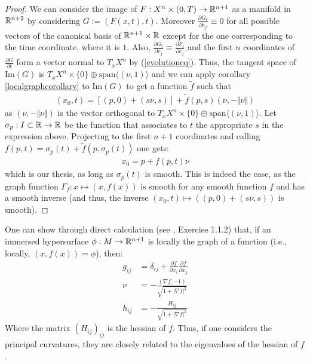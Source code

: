 \begin{proof}
	We can consider the image of $F:X^n\times(0, T)\rightarrow \mathbb{R}^{n+1}$ as a manifold in $\mathbb{R}^{n+2}$ by considering $G:=(F(x, t), t)$. Moreover $\frac{\partial G_t}{\partial e_j}\equiv 0$ for all possible vectors of the canonical basis of $\mathbb{R}^{n+1}\times \mathbb{R}$ except for the one corresponding to the time coordinate, where it is $1$. Also, $\frac{\partial G_i}{\partial e_j}\equiv \frac{\partial F_i}{\partial e_j}$ and the first $n$ coordinates of  $\frac{\partial G}{\partial t}$ form a vector normal to $T_x X^n$ by (\ref{evolutioneq}).  Thus, the tangent space of $\mathrm{Im}(G)$ is $T_x X^n \times \{0\}\oplus  \mathrm{span}\langle (\nu, 1)\rangle$ and we can apply corollary  \ref{localgraphcorollary} to $\mathrm{Im}(G)$ to get a function $\tilde{f}$ such that 
	\begin{align*}
		(x_0, t)= \left[(p, 0) +  (s\nu, s)\right] + \tilde{f}(p, s)(\nu, -\Vert \nu\Vert)
	\end{align*}
	as $(\nu, -\Vert \nu\Vert)$ is the vector orthogonal to  $T_x X^n \times \{0\}\oplus  \mathrm{span}\langle (\nu, 1)\rangle$. Let $\sigma_p:I\subset\mathbb{R}\rightarrow\mathbb{R}$ be the function that associates to $t$ the appropriate $s$ in the expression above.  Projecting to the first $n+1$ coordinates and calling $f(p, t)=\sigma_p(t)+\tilde{f}(p, \sigma_p(t))$ one gets:
	\begin{align*}
		x_0= p + f(p, t)\nu 
	\end{align*}
	which is our thesis, as long as $\sigma_p(t)$ is smooth. This is indeed the case, as the graph function $\Gamma_f:x\mapsto(x, f(x))$ is smooth for any smooth function $f$ and has a smooth inverse (and thus, the inverse $(x_0, t)\mapsto ((p, 0) +  (s\nu, s))$ is smooth).
\end{proof}
One can show through direct calculation (see \cite{mantegazza}, Exercise 1.1.2) that, if an immersed hypersurface $\phi : M\rightarrow \mathbb{R}^{n+1}$ is locally the graph of a function (i.e., locally, $(x, f(x))=\phi$), then: 
\begin{align*}
	g_{ij}&=\delta_{ij}+ \frac{\partial f}{\partial x_i} \frac{\partial f}{\partial x_j}\\
	\nu&= -\frac{(\nabla f, -1)}{\sqrt{1+|\nabla f|^2}}\\
	h_{ij}&= -\frac{H_{ij}}{\sqrt{1+|\nabla f|^2}}
\end{align*}
Where the matrix $(H_{ij})_{ij}$ is the hessian of $f$. Thus, if one considers the principal curvatures, they are closely related to the eigenvalues of the hessian of $f$. 




